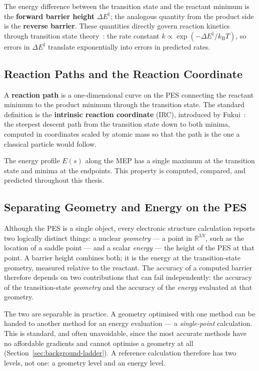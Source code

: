 The energy difference between the transition state and the reactant minimum is the
\textbf{forward barrier height} $\Delta E^\ddagger$; the analogous quantity from
the product side is the \textbf{reverse barrier}. These quantities directly govern
reaction kinetics through transition state theory~\cite{eyring1935}: the rate
constant $k \propto \exp(-\Delta E^\ddagger / k_\text{B} T)$, so errors in
$\Delta E^\ddagger$ translate exponentially into errors in predicted rates.

\subsection{Reaction Paths and the Reaction Coordinate}
\label{sec:background-reactionpath}

A \textbf{reaction path} is a one-dimensional curve on the PES connecting the
reactant minimum to the product minimum through the transition state. The
standard definition is the \textbf{intrinsic reaction coordinate} (IRC), introduced by Fukui~\cite{fukui1981}: the steepest descent path from the transition
state down to both minima, computed in coordinates scaled by atomic mass so that
the path is the one a classical particle would follow.

The energy profile $E(s)$ along the MEP has a single maximum at the transition state
and minima at the endpoints. This property is computed, compared, and predicted throughout this thesis.

\subsection{Separating Geometry and Energy on the PES}
\label{sec:geom-energy}

Although the PES is a single object, every electronic structure calculation reports
two logically distinct things: a nuclear \emph{geometry} --- a point in
$\mathbb{R}^{3N}$, such as the location of a saddle point --- and a scalar
\emph{energy} --- the height of the PES at that point. A barrier height combines
both: it is the energy at the transition-state geometry, measured relative to the
reactant. The accuracy of a computed barrier therefore depends on two contributions
that can fail independently: the accuracy of the transition-state \emph{geometry}
and the accuracy of the \emph{energy} evaluated at that geometry.

The two are separable in practice. A geometry optimised with one method can be
handed to another method for an energy evaluation --- a \emph{single-point}
calculation. This is standard, and often unavoidable, since the most accurate
methods have no affordable gradients and cannot optimise a geometry at all
(Section~\ref{sec:background-ladder}). A reference calculation therefore has two
levels, not one: a geometry level and an energy level.

